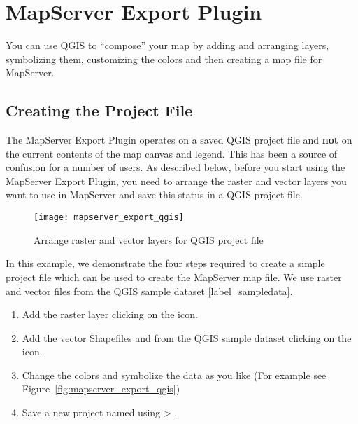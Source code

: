 
\section{MapServer Export Plugin}\label{sec:mapserver_export}


You can use QGIS to ``compose'' your map by adding and arranging layers, 
symbolizing them, customizing the colors and then creating a map file 
for MapServer.

\subsection{Creating the Project File}

The MapServer Export Plugin operates on a saved QGIS project file and 
\textbf{not} on the current contents of the map canvas and legend. This 
has been a source of confusion for a number of users. As described below, 
before you start using the MapServer Export Plugin, you need to arrange 
the raster and vector layers you want to use in MapServer and save this 
status in a QGIS project file.

\begin{figure}[ht]
\centering
  \texttt{[image: mapserver\_export\_qgis]}
   \caption{Arrange raster and vector layers for QGIS project file \nixcaption}
  \label{fig:mapserver_export_qgs}
\end{figure}

In this example, we demonstrate the four steps required to create a simple 
project file which can be used to create the MapServer map file. 
We use raster and vector files from the QGIS sample dataset \ref{label_sampledata}.

\begin{enumerate}
\item Add the raster layer  clicking on the 
 icon.
\item Add the vector Shapefiles  and 
 from the QGIS sample dataset clicking on the 
 icon.
\item Change the colors and symbolize the data as you like (For example see 
Figure~\ref{fig:mapserver_export_qgis})
\item Save a new project named  using 
 > .
\end{enumerate} 

